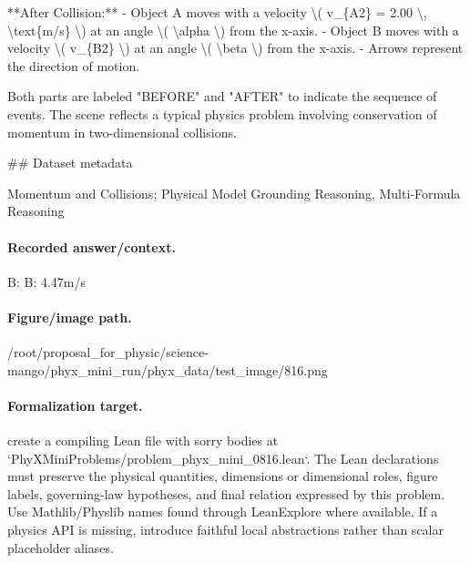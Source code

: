**After Collision:**
- Object A moves with a velocity \textbackslash{}( v\_\{A2\} = 2.00 \textbackslash{}, \textbackslash{}text\{m/s\} \textbackslash{}) at an angle \textbackslash{}( \textbackslash{}alpha \textbackslash{}) from the x-axis.
- Object B moves with a velocity \textbackslash{}( v\_\{B2\} \textbackslash{}) at an angle \textbackslash{}( \textbackslash{}beta \textbackslash{}) from the x-axis.
- Arrows represent the direction of motion.

Both parts are labeled "BEFORE" and "AFTER" to indicate the sequence of events. The scene reflects a typical physics problem involving conservation of momentum in two-dimensional collisions.

\#\# Dataset metadata

Momentum and Collisions; Physical Model Grounding Reasoning, Multi-Formula Reasoning

\paragraph{Recorded answer/context.}
B: B: 4.47m/s

\paragraph{Figure/image path.}
/root/proposal\_for\_physic/science-mango/phyx\_mini\_run/phyx\_data/test\_image/816.png

\paragraph{Formalization target.}
create a compiling Lean file with sorry bodies at `PhyXMiniProblems/problem\_phyx\_mini\_0816.lean`. The Lean declarations must preserve the physical quantities, dimensions or dimensional roles, figure labels, governing-law hypotheses, and final relation expressed by this problem.
Use Mathlib/Physlib names found through LeanExplore where available. If a physics API is missing, introduce faithful local abstractions rather than scalar placeholder aliases.


